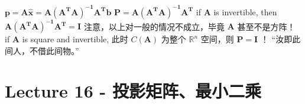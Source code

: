 \documentclass[12pt, a4paper]{article}
\begin{document}
{\begin{math}
	{\mathbf{p}} = {\mathbf{A}}{\mathbf{\hat{x}}} = {\mathbf{A}}{\mathbf{({\mathbf{A^{T}}}{\mathbf{A}})^{-1}}} {\mathbf{A^{T}}}{\mathbf{b}}
\end{math}
\newline
\begin{math}
	{\mathbf{P}} = {\mathbf{A}}{\mathbf{({\mathbf{A^{T}}}{\mathbf{A}})^{-1}}}{\mathbf{A^{T}}}
\end{math}
\vspace{31pt}
\newline
if ${\mathbf{A}}$ is invertible, then ${\mathbf{A}}{\mathbf{({\mathbf{A^{T}}}{\mathbf{A}})^{-1}}}{\mathbf{A^{T}}} = {\mathbf{I}}$
\newline
注意，以上对一般的情况不成立，毕竟 ${\mathbf{A}}$ 甚至不是方阵！
\newline
if ${\mathbf{A}}$ is square and invertible, 
\newline
此时 $C({\mathbf{A}})$ 为整个 $\mathbb{R}^n$ 空间，则 ${\mathbf{P}} = {\mathbf{I}}$ ！
\newline
“汝即此间人，不借此间物。”

\newpage
\section{Lecture 16 - 投影矩阵、最小二乘}
\pagestyle{fancy}
\lhead{}
\rhead{}

}
\end{document}
